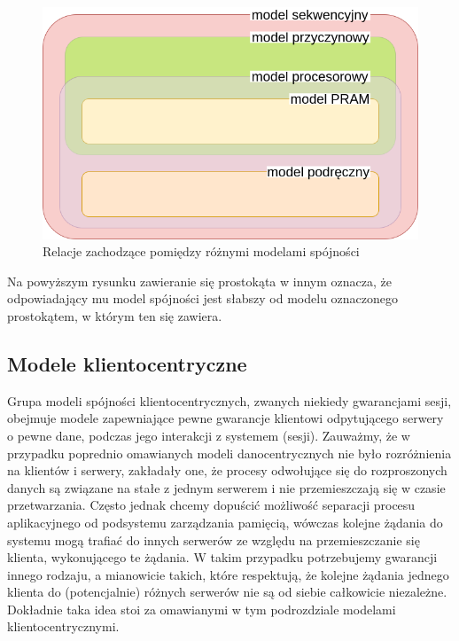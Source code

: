 \begin{figure}[H]
    \includegraphics[width=\linewidth]{images/02-relations.png}
    \caption{Relacje zachodzące pomiędzy różnymi modelami spójności}
    \label{figure:replication_relations}
\end{figure}

Na powyższym rysunku zawieranie się prostokąta w innym oznacza, że odpowiadający mu model spójności jest słabszy od modelu oznaczonego prostokątem, w którym ten się zawiera.

\subsection{Modele klientocentryczne} \label{subsection:clientcentric}

Grupa modeli spójności klientocentrycznych, zwanych niekiedy gwarancjami sesji, obejmuje modele zapewniające pewne gwarancje klientowi odpytującego serwery o pewne dane, podczas jego interakcji z systemem (sesji). Zauważmy, że w przypadku poprednio omawianych modeli danocentrycznych nie było rozróżnienia na klientów i serwery, zakładały one, że procesy odwołujące się do rozproszonych danych są związane na stałe z jednym serwerem i nie przemieszczają się w czasie przetwarzania. Często jednak chcemy dopuścić możliwość separacji procesu aplikacyjnego od podsystemu zarządzania pamięcią, wówczas kolejne żądania do systemu mogą trafiać do innych serwerów ze względu na przemieszczanie się klienta, wykonującego te żądania. W takim przypadku potrzebujemy gwarancji innego rodzaju, a mianowicie takich, które respektują, że kolejne żądania jednego klienta do (potencjalnie) różnych serwerów nie są od siebie całkowicie niezależne. Dokładnie taka idea stoi za omawianymi w tym podrozdziale modelami klientocentrycznymi.

